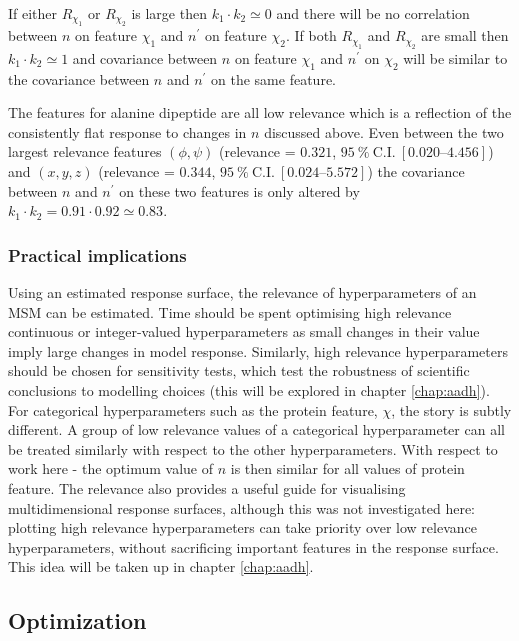 If either $R_{\chi_1}$ or $R_{\chi_2}$ is large then $k_1 \cdot k_2 \simeq 0$ and there will be no correlation between $n$ on feature $\chi_1$ and $n^{\prime}$ on feature $\chi_2$. If both $R_{\chi_1}$ and $R_{\chi_2}$ are small then $k_1 \cdot k_2 \simeq 1$ and covariance between $n$ on feature $\chi_1$ and $n^{\prime}$ on $\chi_2$ will be similar to the covariance between $n$ and $n^{\prime}$ on the same feature.  

The features for alanine dipeptide are all low relevance which is a reflection of the  consistently flat response to changes in $n$ discussed above. Even between  the two largest relevance features $(\phi, \psi)$ (relevance = $0.321$, $\SI{95}{\percent}\ \mathrm{C.I.}\ [\numrange[range-phrase=\text{--}]{0.020}{4.456}]$) and $(x,y,z)$ (relevance = $0.344$, $\SI{95}{\percent}\ \mathrm{C.I.}\ [\numrange[range-phrase=\text{--}]{0.024}{5.572}]$) the covariance between $n$ and $n^{\prime}$ on these two features is only altered by  $k_{1}\cdot k_{2} = 0.91\cdot0.92 \simeq 0.83$. 

\subsubsection{Practical implications}

Using an estimated response surface, the relevance of hyperparameters of an MSM can be estimated. Time should be spent optimising high relevance continuous or integer-valued hyperparameters as small changes in their value imply large changes in model response. Similarly, high relevance hyperparameters should be chosen for sensitivity tests, which test the robustness of scientific conclusions to modelling choices (this will be explored in chapter \ref{chap:aadh}).  For  categorical hyperparameters such as the protein feature, $\chi$, the story is subtly different.  A group of low relevance values of a categorical hyperparameter can all be treated similarly with respect to the other hyperparameters. With respect to work here - the optimum value of $n$ is then similar for all values of protein feature. The relevance also provides a useful guide for visualising multidimensional response surfaces, although this was not investigated here: plotting high relevance hyperparameters can take priority over low relevance hyperparameters, without sacrificing important features in the response surface. This idea will be taken up in chapter \ref{chap:aadh}.  

\subsection{Optimization}\label{sec:ala_opt}

